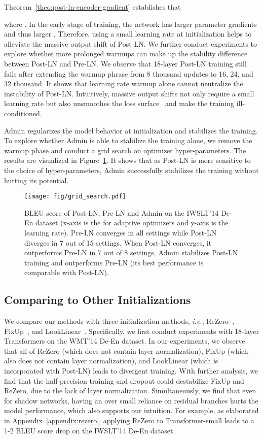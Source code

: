 \documentclass[11pt,a4paper]{article}
\newcommand{\our}{\mbox{Admin}\xspace}
\newcommand{\ie}{\textit{i.e.}}
\begin{document}
Theorem~\ref{theo:post-ln-encoder-gradient} establishes that

where . 
In the early stage of training, the network has larger parameter gradients and thus larger . 
Therefore, using a small learning rate at initialization helps to alleviate the massive output shift of Post-LN. 
We further conduct experiments to explore whether more prolonged warmups can make up the stability difference between Post-LN and Pre-LN.
We observe that 18-layer Post-LN training still fails after extending the warmup phrase from 8 thousand updates to 16, 24, and 32 thousand.
It shows that learning rate warmup alone cannot neutralize the instability of Post-LN. 
Intuitively, massive output shifts not only require a small learning rate but also unsmoothes the loss surface~\cite{Li2018VisualizingTL} and make the training ill-conditioned.

\our regularizes the model behavior at initialization and stabilizes the training. 
To explore whether \our is able to stabilize the training alone, we remove the warmup phase and conduct a grid search on optimizer hyper-parameters. 
The results are visualized in Figure~\ref{fig:grid-search}. 
It shows that as Post-LN is more sensitive to the choice of hyper-parameters, \our successfully stabilizes the training without hurting its potential.  

\begin{figure}[t]
\centering
\texttt{[image: fig/grid\_search.pdf]}
\caption{
BLEU score of Post-LN, Pre-LN and Admin on the IWSLT'14 De-En dataset (x-axis is the  for adaptive optimizers and y-axis is the learning rate). Pre-LN converges in all settings while Post-LN diverges in 7 out of 15 settings. 
When Post-LN converges, it outperforms Pre-LN in 7 out of 8 settings. 
Admin stabilizes Post-LN training and outperforms Pre-LN (its best performance is comparable with Post-LN). }
\label{fig:grid-search}
\end{figure}

\subsection{Comparing to Other Initializations}

We compare our methods with three initialization methods, \ie, ReZero~\cite{Bachlechner2020ReZeroIA}, FixUp~\cite{zhang2018residual}, and LookLinear~\cite{balduzzi17b}.
Specifically, we first conduct experiments with 18-layer Transformers on the WMT'14 De-En dataset. 
In our experiments, we observe that all of ReZero (which does not contain layer normalization), FixUp (which also does not contain layer normalization), and LookLinear (which is incorporated with Post-LN) leads to divergent training.
With further analysis, we find that the half-precision training and dropout could destabilize FixUp and ReZero, due to the lack of layer normalization.
Simultaneously, we find that even for shadow networks, having an over small reliance on residual branches hurts the model performance, which also supports our intuition. 
For example, as elaborated in Appendix~\ref{appendix:rezero}, applying ReZero to Transformer-small leads to a 1-2 BLEU score drop on the IWSLT'14 De-En dataset. 
 
\end{document}
